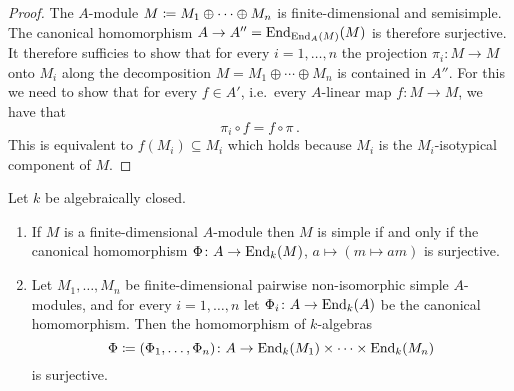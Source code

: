 \begin{proof}
  The $A$-module $M \coloneqq M_1 \oplus \dotsb \oplus M_n$ is finite-dimensional and semisimple.
  The canonical homomorphism $A \to A'' = \operatorname{End}_{\operatorname{End}_A(M)}(M)$ is therefore surjective.
  It therefore sufficies to show that for every $i = 1, \dotsc, n$ the projection $\pi_i \colon M \to M$ onto $M_i$ along the decomposition $M = M_1 \oplus \dotsb \oplus M_n$ is contained in $A''$.
  For this we need to show that for every $f \in A'$, i.e.\ every $A$-linear map $f \colon M \to M$, we have that
  \[
      \pi_i \circ f
    = f \circ \pi \,.
  \]
  This is equivalent to $f(M_i) \subseteq M_i$ which holds because $M_i$ is the $M_i$-isotypical component of $M$.
\end{proof}


\begin{theorem}
  \label{theorem: density theorem}
  Let $k$ be algebraically closed.
  \begin{enumerate}
    \item
      \label{enumerate: density theorem for one module}
      If $M$ is a finite-dimensional $A$-module then $M$ is simple if and only if the canonical homomorphism $\Phi \colon A \to \operatorname{End}_k(M)$, $a \mapsto (m \mapsto am)$ is surjective.
    \item
      Let $M_1, \dotsc, M_n$ be finite-dimensional pairwise non-isomorphic simple $A$-modules, and for every $i = 1, \dotsc, n$ let $\Phi_i \colon A \to \operatorname{End}_k(A)$ be the canonical homomorphism.
      Then the homomorphism of $k$-algebras
      \[
                  \Phi
        \coloneqq  (\Phi_1, \dotsc, \Phi_n)
        \colon    A
        \to       \operatorname{End}_k(M_1) \times \dotsb \times \operatorname{End}_k(M_n)
      \]
      is surjective.
  \end{enumerate}
\end{theorem}


